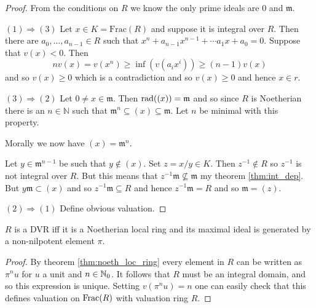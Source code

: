 \documentclass{memoir}
\begin{document}
\begin{proof}
    From the conditions on $R$ we know the only prime ideals are $0$ and $\mathfrak m$.

    $(1)\Rightarrow (3)$ Let $x\in K = \text{Frac}(R)$ and suppose it is integral over $R$.
    Then there are $a_0,\dots,a_{n-1}\in R$ such that $x^n+a_{n-1}x^{n-1}+\cdots a_1x+a_0 = 0$.
    Suppose that $v(x)<0$. Then 
    \begin{equation}
        nv(x) = v(x^n) \ge \inf(v(a_ix^i)) \ge (n-1)v(x)
    \end{equation}
    and so $v(x)\ge0$ which is a contradiction and so $v(x)\ge0$ and hence $x\in r$.

    $(3)\Rightarrow (2)$ Let $0\ne x\in \mathfrak m$. Then $\text{rad}((x)) = \mathfrak m$ and so since $R$ is Noetherian there is an $n\in \mathbb N$ such that $\mathfrak m^n\subseteq (x) \subseteq \mathfrak m$. Let $n$ be minimal with this property. 
    \begin{remark}
        Morally we now have $(x) = \mathfrak m^n$.
    \end{remark}
    Let $y \in \mathfrak m^{n-1}$ be such that $y\not\in (x)$.
    Set $z = x/y\in K$.
    Then $z^{-1}\not\in R$ so $z^{-1}$ is not integral over $R$.
    But this means that $z^{-1}\mathfrak m\nsubseteq \mathfrak m$ my theorem \ref{thm:int_dep}.
    But $y\mathfrak m\subset (x)$ and so $z^{-1}\mathfrak m\subseteq R$ and hence $z^{-1}\mathfrak m = R$  and so $\mathfrak m = (z)$.

    $(2)\Rightarrow (1)$ Define obvious valuation. 
\end{proof}
\begin{proposition}
    $R$ is a DVR iff it is a Noetherian local ring and its maximal ideal is generated by a non-nilpotent element $\pi$.
\end{proposition}
\begin{proof}
    By theorem \ref{thm:noeth_loc_ring} every element in $R$ can be written as $\pi^nu$ for $u$ a unit and $n\in \mathbb{N}_0$.
    It follows that $R$ must be an integral domain, and so this expression is unique.
    Setting $v(\pi^nu) = n$ one can easily check that this defines valuation on $\text{Frac}(R)$ with valuation ring $R$.
\end{proof}
\end{document}
